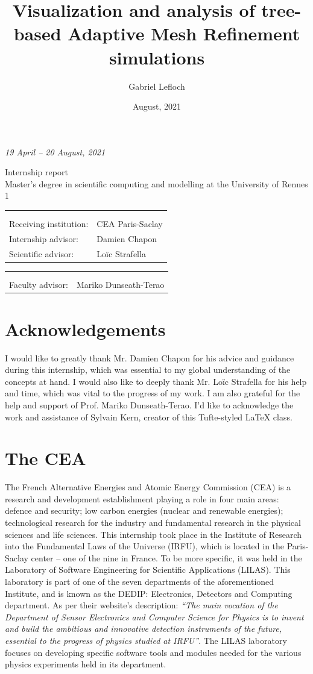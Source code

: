 \documentclass[
	a4paper,
	12pt,
	raggedright,
	twoside
]{tufte-style-article}
\title{Visualization and analysis of tree-based Adaptive Mesh Refinement simulations}
\author{Gabriel Lefloch}
\date{August, 2021}
\makeatletter
\theoremstyle{definition}
\theoremstyle{remark}
\renewcommand\@maketitlebis{%
    \noindent
    {\Large \itshape \@author \hfill \normalsize 19 April -- 20 August, 2021}
    \begin{minipage}{.8\textwidth}
        \vspace{4cm}
		{\huge\raggedright \@title \par }
		\vskip 20pt
		{\Large Internship report}\\
		\vskip 8pt
		Master's degree in scientific computing and modelling at the University of Rennes 1
	\end{minipage}

	\vfill
	\noindent
    \begin{tabular}{ l l  }
         & \\
        &\\
        Receiving institution: &CEA Paris-Saclay \\
        Internship advisor: &Damien Chapon \\
        Scientific advisor: &Loïc Strafella
    \end{tabular}

    \vskip 1cm
    \noindent
    \begin{tabular}{ l l  }
         &\\
        &\\
        Faculty advisor: &Mariko Dunseath-Terao
    \end{tabular}

}
\renewcommand\maketitle{
    \@maketitlebis
    \thispagestyle{empty}
}
\makeatother
\begin{document}
\maketitle

\cleardoublepage

\tableofcontents

\newpage

\section{Acknowledgements}
I would like to greatly thank Mr. Damien Chapon for his advice and guidance during this internship, which was essential to my global understanding of the concepts at hand. I would also like to deeply thank Mr. Loïc Strafella for his help and time, which was vital to the progress of my work. I am also grateful for the help and support of Prof. Mariko Dunseath-Terao.  I’d like to acknowledge the work and assistance of Sylvain Kern, creator of this Tufte-styled \LaTeX{} class.


\section{The CEA}
The French Alternative Energies and Atomic Energy Commission (CEA) is a research and development establishment playing a role in four main areas: defence and security; low carbon energies (nuclear and renewable energies); technological research for the industry and fundamental research in the physical sciences and life sciences.\cite{CEA} This internship took place in the Institute of Research into the Fundamental Laws of the Universe (IRFU), which is located in the Paris-Saclay center -- one of the nine in France.
To be more specific, it was held in the Laboratory of Software Engineering for Scientific Applications (LILAS). This laboratory is part of one of the seven departments of the aforementioned Institute, and is known as the DEDIP: Electronics, Detectors and Computing department. As per their website's description:\cite{DEDIP} \textit{“The main vocation of the Department of Sensor Electronics and Computer Science for Physics is to invent and build the ambitious and innovative detection instruments of the future, essential to the progress of physics studied at IRFU”}. The LILAS laboratory focuses on developing specific software tools and modules needed for the various physics experiments held in its department.
\end{document}
